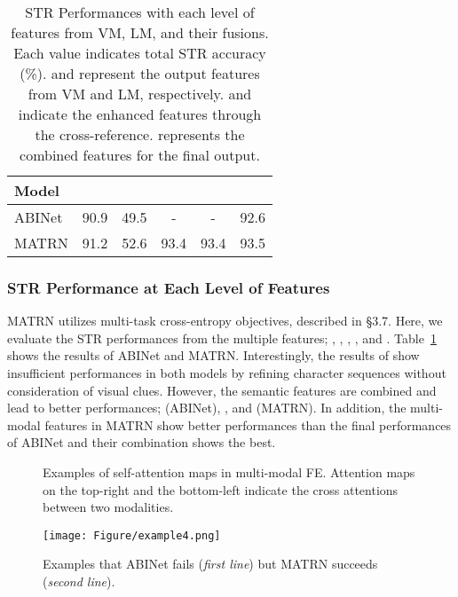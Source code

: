 \documentclass[runningheads]{llncs}
\begin{document}
\begin{table}[t]
\caption{STR Performances with each level of features from VM, LM, and their fusions. Each value indicates total STR accuracy (\%).  and  represent the output features from VM and LM, respectively.  and  indicate the enhanced features through the cross-reference.  represents the combined features for the final output.}
\small
\tabcolsep=0.2cm
\label{tab:final_prediction}
\centering
\begin{centering}
\begin{tabular}{l|cc|cc|c}
\toprule
Model &  &  &  &  &  \\
\midrule
ABINet & 90.9 & 49.5 & - & - & 92.6 \\
MATRN & 91.2 & 52.6 & 93.4 & 93.4 & 93.5 \\
\bottomrule
\end{tabular}
\end{centering}
\end{table}

\subsubsection{STR Performance at Each Level of Features}
MATRN utilizes multi-task cross-entropy objectives, described in \S3.7. Here, we evaluate the STR performances from the multiple features; , , , , and . Table~\ref{tab:final_prediction} shows the results of ABINet and MATRN. Interestingly, the results of  show insufficient performances in both models by refining character sequences without consideration of visual clues. However, the semantic features are combined and lead to better performances;  (ABINet), , and  (MATRN). In addition, the multi-modal features in MATRN show better performances than the final performances of ABINet and their combination shows the best. 

\begin{figure}[t]
\centering
    \caption{Examples of self-attention maps in multi-modal FE. Attention maps on the top-right and the bottom-left indicate the cross attentions between two modalities.}
    \label{fig:attn_map}
\end{figure}

\begin{figure}[t]
\centering
    \texttt{[image: Figure/example4.png]}
    \caption{Examples that ABINet fails (\textit{first line}) but MATRN succeeds (\textit{second line}).}
    \label{fig:examples}
\end{figure}
\end{document}
